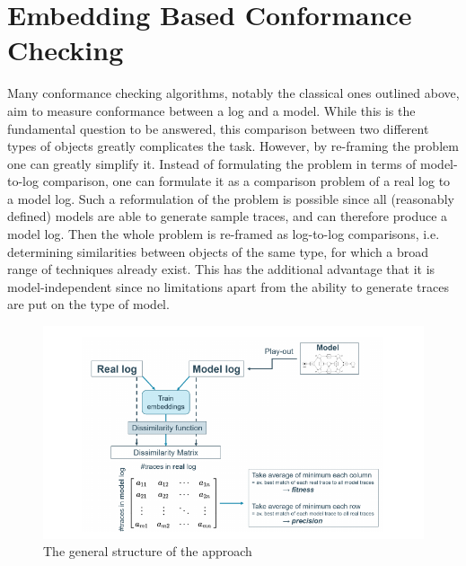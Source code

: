\documentclass[runningheads]{template/llncs}
\begin{document}
\section{Embedding Based Conformance Checking}
\label{sec:method}
Many conformance checking algorithms, notably the classical ones outlined above, aim to measure conformance between a log and a model.
While this is the fundamental question to be answered, this comparison between two different types of objects greatly complicates the task.
However, by re-framing the problem one can greatly simplify it.
Instead of formulating the problem in terms of model-to-log comparison, one can formulate it as a comparison problem of a real log to a model log.
Such a reformulation of the problem is possible since all (reasonably defined) models are able to generate sample traces, and can therefore produce a model log.
Then the whole problem is re-framed as log-to-log comparisons, i.e. determining similarities between objects of the same type, for which a broad range of techniques already exist.
This has the additional advantage that it is model-independent since no limitations apart from the ability to generate traces are put on the type of model.
\begin{figure}
	\includegraphics[width=1\textwidth]{figures/structure}
	\caption{The general structure of the approach}
	\label{fig:structure}
\end{figure}
\end{document}
